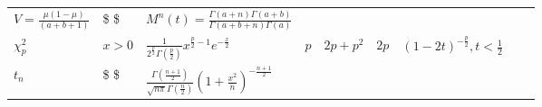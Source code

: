 \documentclass[]{tufte-book}
\begin{document}
\begin{longtable}[]{@{}lllllllll@{}}
\begin{minipage}[t]{0.08\columnwidth}
\(V=\frac{\mu(1-\mu)}{(a+b+1)}\)\strut
\end{minipage} & \begin{minipage}[t]{0.08\columnwidth}\raggedright
\$ \$\strut
\end{minipage} & \begin{minipage}[t]{0.08\columnwidth}\raggedright
\(M^n(t)=\frac{\Gamma(a+n)\Gamma(a+b)}{\Gamma(a+b+n)\Gamma(a)}\)\strut
\end{minipage}\tabularnewline
\begin{minipage}[t]{0.08\columnwidth}\raggedright
\(\chi_p^2\)\strut
\end{minipage} & \begin{minipage}[t]{0.08\columnwidth}\raggedright
\(x>0\)\strut
\end{minipage} & \begin{minipage}[t]{0.08\columnwidth}\raggedright
\(\frac{1}{2^{\frac{p}2}\Gamma(\frac{p}2)}x^{\frac{p}2-1}e^{-\frac{x}2}\)\strut
\end{minipage} & \begin{minipage}[t]{0.08\columnwidth}\raggedright
\(p\)\strut
\end{minipage} & \begin{minipage}[t]{0.08\columnwidth}\raggedright
\(2p+p^2\)\strut
\end{minipage} & \begin{minipage}[t]{0.08\columnwidth}\raggedright
\(2p\)\strut
\end{minipage} & \begin{minipage}[t]{0.08\columnwidth}\raggedright
\((1-2t)^{-\frac{p}2}, t<\frac12\)\strut
\end{minipage} & \begin{minipage}[t]{0.08\columnwidth}\raggedright
\strut
\end{minipage} & \begin{minipage}[t]{0.08\columnwidth}\raggedright
\strut
\end{minipage}\tabularnewline
\begin{minipage}[t]{0.08\columnwidth}\raggedright
\(t_n\)\strut
\end{minipage} & \begin{minipage}[t]{0.08\columnwidth}\raggedright
\$ \$\strut
\end{minipage} & \begin{minipage}[t]{0.08\columnwidth}\raggedright
\(\frac{\Gamma(\frac{n+1}2)}{\sqrt{n\pi} \Gamma(\frac{n}2)} (1+\frac{x^2}n)^{-\frac{n+1}2}\)\strut
\end{minipage} & \begin{minipage}[t]{0.08\columnwidth}\raggedright

\end{minipage}
\end{longtable}
\end{document}
